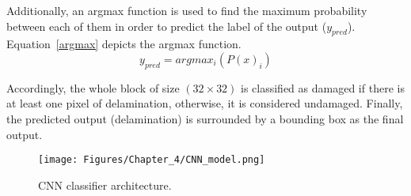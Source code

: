 Additionally, an argmax function is used to find the maximum probability between each of them in order to predict the label of the output (\(y_{pred}\)).
Equation~\ref{argmax} depicts the argmax function.
\begin{equation}
	y_{pred} = argmax_{i}\left( P(x)_{i} \right)
	\label{argmax}
\end{equation}

Accordingly, the whole block of size \((32\times 32)\) is classified as damaged if there is at least one pixel of delamination, otherwise, it is considered undamaged.
Finally, the predicted output (delamination) is surrounded by a bounding box as the final output.
\begin{figure}[h!]
	\centering
	\texttt{[image: Figures/Chapter\_4/CNN\_model.png]}
	\caption{CNN classifier architecture.}
	\label{CNN_model}
\end{figure}
